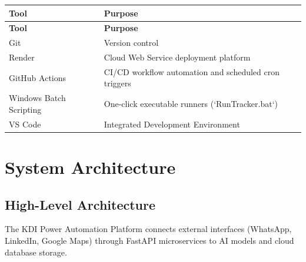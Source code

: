 \documentclass[12pt,a4paper]{report}
\begin{document}
\begin{longtable}{|p{4cm}|p{9cm}|}
\hline
\textbf{Tool} & \textbf{Purpose} \\
\hline
\endfirsthead
\hline
\textbf{Tool} & \textbf{Purpose} \\
\hline
\endhead
Git & Version control \\
\hline
Render & Cloud Web Service deployment platform \\
\hline
GitHub Actions & CI/CD workflow automation and scheduled cron triggers \\
\hline
Windows Batch Scripting & One-click executable runners (`RunTracker.bat`) \\
\hline
VS Code & Integrated Development Environment \\
\hline
\end{longtable}

\section{System Architecture}

\subsection{High-Level Architecture}

The KDI Power Automation Platform connects external interfaces (WhatsApp, LinkedIn, Google Maps) through FastAPI microservices to AI models and cloud database storage.
\end{document}
